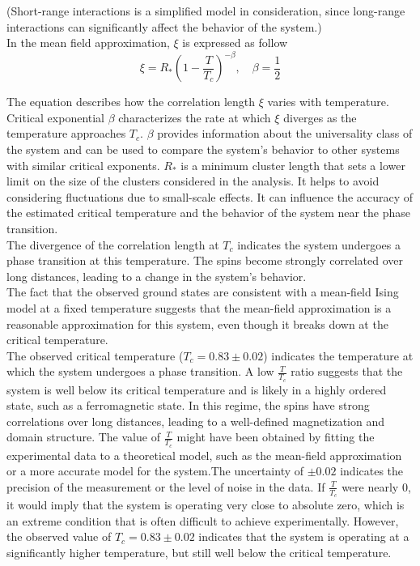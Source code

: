 (Short-range interactions is a simplified model in consideration, since long-range interactions can significantly affect the behavior of the system.) \\

In the mean field approximation, $\xi$ is expressed as follow 
\begin{equation}
\xi = R_* (1 - \frac{T}{T_c})^{-\beta}, \quad \beta = \frac{1}{2}
\end{equation}

The equation describes how the correlation length $\xi$ varies with temperature. Critical exponential $\beta$ characterizes the rate at which $\xi$ diverges as the temperature approaches $T_c$. $\beta$ provides information about the universality class of the system and can be used to compare the system's behavior to other systems with similar critical exponents. $R_*$ is a minimum cluster length that sets a lower limit on the size of the clusters considered in the analysis. It helps to avoid considering fluctuations due to small-scale effects. It can influence the accuracy of the estimated critical temperature and the behavior of the system near the phase transition. \\

The divergence of the correlation length at $T_c$ indicates the system undergoes a phase transition at this temperature. The spins become strongly correlated over long distances, leading to a change in the system's behavior. \\

The fact that the observed ground states are consistent with a mean-field Ising model at a fixed temperature suggests that the mean-field approximation is a reasonable approximation for this system, even though it breaks down at the critical temperature. \\

The observed critical temperature ($T_c = 0.83 \pm 0.02$) indicates the temperature at which the system undergoes a phase transition. A low $\frac{T}{T_c}$ ratio suggests that the system is well below its critical temperature and is likely in a highly ordered state, such as a ferromagnetic state. In this regime, the spins have strong correlations over long distances, leading to a well-defined magnetization and domain structure. The value of $\frac{T}{T_c}$ might have been obtained by fitting the experimental data to a theoretical model, such as the mean-field approximation or a more accurate model for the system.The uncertainty of $\pm 0.02$ indicates the precision of the measurement or the level of noise in the data. If $\frac{T}{T_c}$ were nearly $0$, it would imply that the system is operating very close to absolute zero, which is an extreme condition that is often difficult to achieve experimentally. However, the observed value of $T_c = 0.83 \pm 0.02$ indicates that the system is operating at a significantly higher temperature, but still well below the critical temperature. \\

